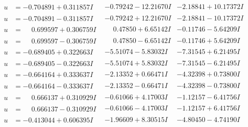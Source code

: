 \documentclass[1p]{elsarticle_modified}
\theoremstyle{definition}
\begin{document}
$$\begin{array}{c|c|c}
\begin{aligned}
u &= -0.704891 + 0.311857 I\end{aligned}
 & -0.79242 - 12.21670 I & -2.18841 + 10.17372 I \\ \hline\begin{aligned}
u &= -0.704891 - 0.311857 I\end{aligned}
 & -0.79242 + 12.21670 I & -2.18841 - 10.17372 I \\ \hline\begin{aligned}
u &= \phantom{-}0.699597 + 0.306759 I\end{aligned}
 & \phantom{-}0.47850 + 6.65142 I & -0.11746 - 5.64209 I \\ \hline\begin{aligned}
u &= \phantom{-}0.699597 - 0.306759 I\end{aligned}
 & \phantom{-}0.47850 - 6.65142 I & -0.11746 + 5.64209 I \\ \hline\begin{aligned}
u &= -0.689405 + 0.322663 I\end{aligned}
 & -5.51074 - 5.83032 I & -7.31545 + 6.21495 I \\ \hline\begin{aligned}
u &= -0.689405 - 0.322663 I\end{aligned}
 & -5.51074 + 5.83032 I & -7.31545 - 6.21495 I \\ \hline\begin{aligned}
u &= -0.664164 + 0.333637 I\end{aligned}
 & -2.13352 + 0.66471 I & -4.32398 + 0.73800 I \\ \hline\begin{aligned}
u &= -0.664164 - 0.333637 I\end{aligned}
 & -2.13352 - 0.66471 I & -4.32398 - 0.73800 I \\ \hline\begin{aligned}
u &= \phantom{-}0.666137 + 0.310929 I\end{aligned}
 & -0.61066 + 4.17003 I & -1.12157 - 6.41756 I \\ \hline\begin{aligned}
u &= \phantom{-}0.666137 - 0.310929 I\end{aligned}
 & -0.61066 - 4.17003 I & -1.12157 + 6.41756 I \\ \hline\begin{aligned}
u &= -0.413044 + 0.606395 I\end{aligned}
 & -1.96609 + 8.30515 I & -4.80450 - 4.74190 I \\ \hline\begin{aligned}

\end{aligned}
\end{array}$$
\end{document}
